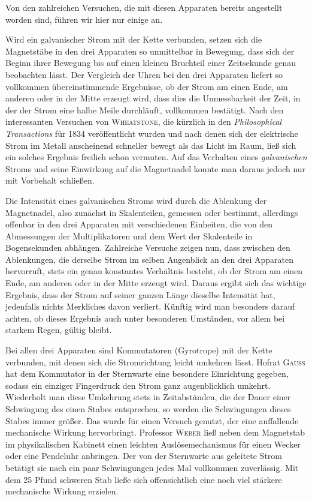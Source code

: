 Von den zahlreichen Versuchen, die mit diesen Apparaten bereits angestellt worden sind, führen wir hier nur einige an.

Wird ein galvanischer Strom mit der Kette verbunden, setzen sich die Magnetstäbe in den drei Apparaten so unmittelbar in Bewegung, dass sich der Beginn ihrer Bewegung bis auf einen kleinen Bruchteil einer Zeitsekunde genau beobachten lässt. Der Vergleich der Uhren bei den drei Apparaten liefert so vollkommen übereinstimmende Ergebnisse, ob der Strom am einen Ende, am anderen oder in der Mitte erzeugt wird, dass dies die Unmessbarkeit der Zeit, in der der Strom eine halbe Meile durchläuft, vollkommen bestätigt. Nach den interessanten Versuchen von \textsc{Wheatstone}, die kürzlich in den \textit{Philosophical Transactions} für 1834 veröffentlicht wurden und nach denen sich der elektrische Strom im Metall anscheinend schneller bewegt als das Licht im Raum, ließ sich ein solches Ergebnis freilich schon vermuten. Auf das Verhalten eines \textit{galvanischen} Stroms und seine Einwirkung auf die Magnetnadel konnte man daraus jedoch nur mit Vorbehalt schließen.

Die Intensität eines galvanischen Stroms wird durch die Ablenkung der Magnetnadel, also zunächst in Skalenteilen, gemessen oder bestimmt, allerdings
offenbar in den drei Apparaten mit verschiedenen Einheiten, die von den Abmessungen der Multiplikatoren und dem Wert der Skalenteile in Bogensekunden abhängen. Zahlreiche Versuche zeigen nun, dass zwischen den Ablenkungen, die derselbe Strom im selben Augenblick an den drei Apparaten hervorruft, stets ein genau konstantes Verhältnis besteht, ob der Strom am einen Ende, am anderen oder in der Mitte erzeugt wird. Daraus ergibt sich das wichtige Ergebnis, dass der Strom auf seiner ganzen Länge dieselbe Intensität hat, jedenfalls nichts Merkliches davon verliert. Künftig wird man besonders darauf achten, ob dieses Ergebnis auch unter besonderen Umständen, vor allem bei starkem Regen, gültig bleibt.

Bei allen drei Apparaten sind Kommutatoren (Gyrotrope) mit der Kette verbunden, mit denen sich die Stromrichtung leicht umkehren lässt. Hofrat \textsc{Gauss} hat dem Kommutator in der Sternwarte eine besondere Einrichtung gegeben, sodass ein einziger Fingerdruck den Strom ganz augenblicklich umkehrt. Wiederholt man diese Umkehrung stets in Zeitabständen, die der Dauer einer Schwingung des einen Stabes entsprechen, so werden die Schwingungen dieses Stabes immer größer. Das wurde für einen Versuch genutzt, der eine auffallende mechanische Wirkung hervorbringt. Professor \textsc{Weber} ließ neben dem Magnetstab im physikalischen Kabinett einen leichten Auslösemechanismus für einen Wecker oder eine Pendeluhr anbringen. Der von der Sternwarte aus geleitete Strom betätigt sie nach ein paar Schwingungen jedes Mal vollkommen zuverlässig. Mit dem 25 Pfund schweren Stab ließe sich offensichtlich eine noch viel stärkere mechanische Wirkung erzielen.

